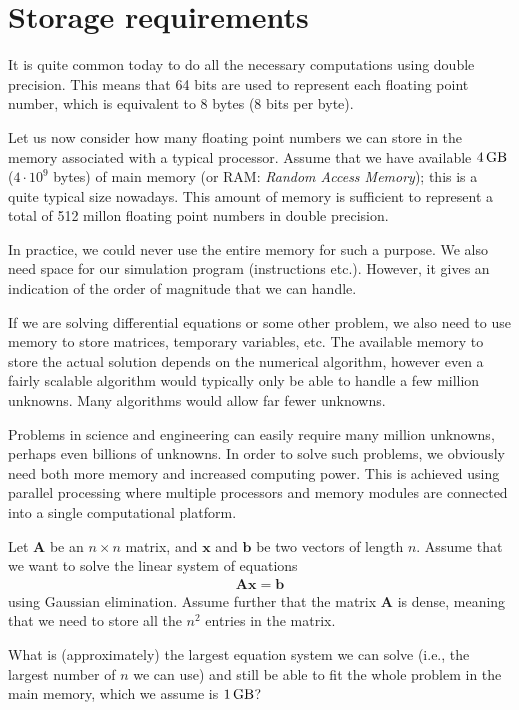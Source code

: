 \section{Storage requirements}

It is quite common today to do all the necessary computations using double
precision. This means that 64 bits are used to represent each floating point
number, which is equivalent to 8 bytes (8 bits per byte).

Let us now consider how many floating point numbers we can store in the memory
associated with a typical processor. Assume that we have available
$\SI{4}{\giga\byte}$ ($4\cdot 10^9$ bytes) of main memory (or RAM: \emph{Random
Access Memory}); this is a quite typical size nowadays. This amount of memory is
sufficient to represent a total of 512 millon floating point numbers in double
precision.

In practice, we could never use the entire memory for such a purpose. We also
need space for our simulation program (instructions etc.). However, it gives an
indication of the order of magnitude that we can handle.

If we are solving differential equations or some other problem, we also need to
use memory to store matrices, temporary variables, etc. The available memory to
store the actual solution depends on the numerical algorithm, however even a
fairly scalable algorithm would typically only be able to handle a few million
unknowns. Many algorithms would allow far fewer unknowns.

Problems in science and engineering can easily require many million unknowns,
perhaps even billions of unknowns. In order to solve such problems, we obviously
need both more memory and increased computing power. This is achieved using
parallel processing where multiple processors and memory modules are connected
into a single computational platform.

\begin{ex}
  Let $\bm A$ be an $n\times n$ matrix, and $\bm x$ and $\bm b$ be two vectors
  of length $n$. Assume that we want to solve the linear system of equations
  \begin{align*}
    \bm A \bm x = \bm b
  \end{align*}
  using Gaussian elimination. Assume further that the matrix $\bm A$ is dense,
  meaning that we need to store all the $n^2$ entries in the matrix.

  What is (approximately) the largest equation system we can solve (i.e., the
  largest number of $n$ we can use) and still be able to fit the whole problem
  in the main memory, which we assume is $\SI{1}{\giga\byte}$?
\end{ex}


